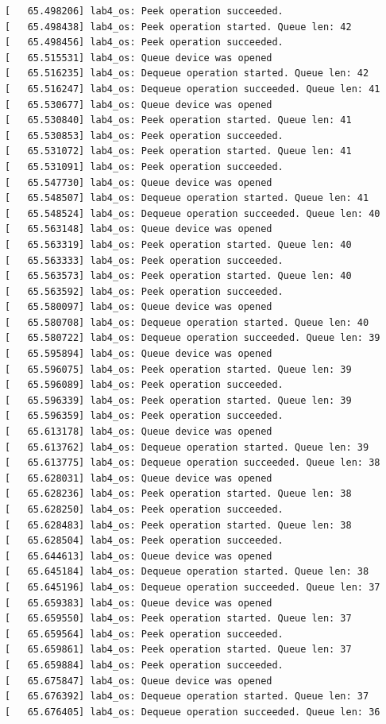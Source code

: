 \documentclass[a4paper,14pt]{extarticle}
\begin{document}
\begin{verbatim}
[   65.498206] lab4_os: Peek operation succeeded.
[   65.498438] lab4_os: Peek operation started. Queue len: 42
[   65.498456] lab4_os: Peek operation succeeded.
[   65.515531] lab4_os: Queue device was opened
[   65.516235] lab4_os: Dequeue operation started. Queue len: 42
[   65.516247] lab4_os: Dequeue operation succeeded. Queue len: 41
[   65.530677] lab4_os: Queue device was opened
[   65.530840] lab4_os: Peek operation started. Queue len: 41
[   65.530853] lab4_os: Peek operation succeeded.
[   65.531072] lab4_os: Peek operation started. Queue len: 41
[   65.531091] lab4_os: Peek operation succeeded.
[   65.547730] lab4_os: Queue device was opened
[   65.548507] lab4_os: Dequeue operation started. Queue len: 41
[   65.548524] lab4_os: Dequeue operation succeeded. Queue len: 40
[   65.563148] lab4_os: Queue device was opened
[   65.563319] lab4_os: Peek operation started. Queue len: 40
[   65.563333] lab4_os: Peek operation succeeded.
[   65.563573] lab4_os: Peek operation started. Queue len: 40
[   65.563592] lab4_os: Peek operation succeeded.
[   65.580097] lab4_os: Queue device was opened
[   65.580708] lab4_os: Dequeue operation started. Queue len: 40
[   65.580722] lab4_os: Dequeue operation succeeded. Queue len: 39
[   65.595894] lab4_os: Queue device was opened
[   65.596075] lab4_os: Peek operation started. Queue len: 39
[   65.596089] lab4_os: Peek operation succeeded.
[   65.596339] lab4_os: Peek operation started. Queue len: 39
[   65.596359] lab4_os: Peek operation succeeded.
[   65.613178] lab4_os: Queue device was opened
[   65.613762] lab4_os: Dequeue operation started. Queue len: 39
[   65.613775] lab4_os: Dequeue operation succeeded. Queue len: 38
[   65.628031] lab4_os: Queue device was opened
[   65.628236] lab4_os: Peek operation started. Queue len: 38
[   65.628250] lab4_os: Peek operation succeeded.
[   65.628483] lab4_os: Peek operation started. Queue len: 38
[   65.628504] lab4_os: Peek operation succeeded.
[   65.644613] lab4_os: Queue device was opened
[   65.645184] lab4_os: Dequeue operation started. Queue len: 38
[   65.645196] lab4_os: Dequeue operation succeeded. Queue len: 37
[   65.659383] lab4_os: Queue device was opened
[   65.659550] lab4_os: Peek operation started. Queue len: 37
[   65.659564] lab4_os: Peek operation succeeded.
[   65.659861] lab4_os: Peek operation started. Queue len: 37
[   65.659884] lab4_os: Peek operation succeeded.
[   65.675847] lab4_os: Queue device was opened
[   65.676392] lab4_os: Dequeue operation started. Queue len: 37
[   65.676405] lab4_os: Dequeue operation succeeded. Queue len: 36

\end{verbatim}
\end{document}
